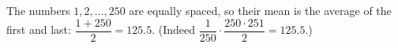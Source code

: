 The numbers $1,2,\dots,250$ are equally spaced, so their mean is the average of the first and last: $\dfrac{1+250}{2}=\boxed{125.5}$. (Indeed $\dfrac{1}{250}\cdot\dfrac{250\cdot251}{2}=125.5$.)
